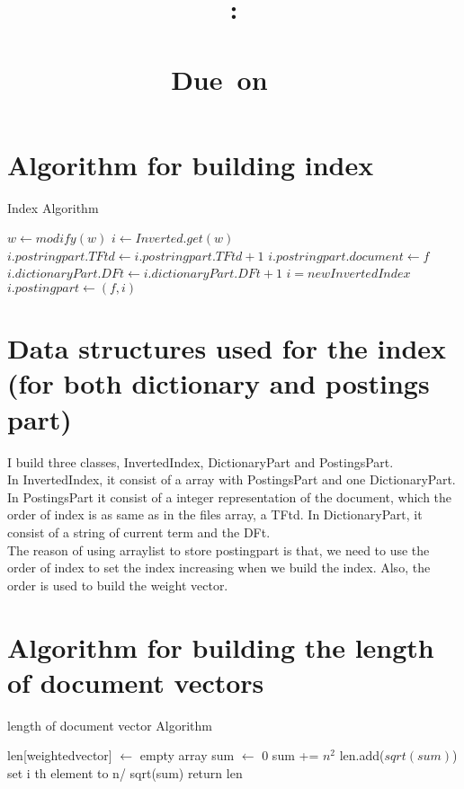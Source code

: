 \documentclass{article}
\title{
    \vspace{2in}
    \textmd{\textbf{\hmwkClass:\\\ \hmwkTitle}}\\
    \normalsize\vspace{0.1in}\small{Due\ on\ \hmwkDueDate\ }\\
    \vspace{0.1in}\large{\textit{\hmwkClassInstructor}}
    \vspace{3in}
}
\author{\textbf{\hmwkAuthorName}}
\date{}
\begin{document}
\maketitle
\newpage
\tableofcontents
\newpage

\section{Algorithm for building index}
\begin{algorithm}
\caption{Index Algorithm}\label{alg:in}
\begin{algorithmic}[1]
\State $w \gets modify(w)$
\State $i \gets Inverted.get(w)$
\State $i.postringpart.TFtd \gets i.postringpart.TFtd + 1$
\Else
\State $i.postringpart.document \gets f$
\State $i.dictionaryPart.DFt \gets i.dictionaryPart.DFt + 1$
\EndIf
\Else
\State $i = new InvertedIndex$
\State $i.postingpart \gets (f,i)$
\EndIf
\EndFor
\EndProcedure
\end{algorithmic}
\end{algorithm}

\section{Data structures used for the index (for both dictionary and postings part)}
I build three classes, InvertedIndex, DictionaryPart and PostingsPart.\\

In InvertedIndex, it consist of a array with PostingsPart and one DictionaryPart. In PostingsPart it consist of a integer representation of the document, which the order of index is as same as in the files array, a TFtd. In DictionaryPart, it consist of a string of current term and the DFt.\\

The reason of using arraylist to store postingpart is that, we need to use the order of index to set the index increasing when we build the index. Also, the order is used to build the weight vector.

\clearpage



\section{Algorithm for building the length of document vectors}
\begin{algorithm}
\caption{length of document vector Algorithm}\label{alg:in}
\begin{algorithmic}[1]
\State len[weightedvector] $\gets$ empty array
\State sum $\gets$ 0
\State sum += $n^{2}$
\EndFor
\State len.add($sqrt(sum)$)
\State  set i th element to n/ sqrt(sum)
\EndFor
\EndFor
\State return len
\EndProcedure
\end{algorithmic}
\end{algorithm}
\end{document}
